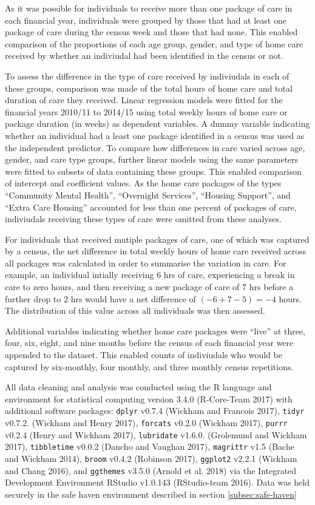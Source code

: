 \documentclass[]{article}
\begin{document}
As it was possible for individuals to receive more than one package of
care in each financial year, individuals were grouped by those that had
at least one package of care during the census week and those that had
none. This enabled comparison of the proportions of each age group,
gender, and type of home care received by whether an indiviudal had been
identified in the census or not.

To assess the difference in the type of care received by indiviudals in
each of these groups, comparison was made of the total hours of home
care and total duration of care they received. Linear regression models
were fitted for the financial years 2010/11 to 2014/15 using total
weekly hours of home care or package duration (in weeks) as dependent
variables. A dummy variable indicating whether an individual had a least
one package identified in a census was used as the independent
predictor. To compare how differences in care varied across age, gender,
and care type groups, further linear models using the same parameters
were fitted to subsets of data containing these groups. This enabled
comparison of intercept and coefficient values. As the home care
packages of the types ``Community Mental Health'', ``Overnight
Services'', ``Housing Support'', and ``Extra Care Housing'' accounted
for less than one percent of packages of care, indiviudals receiving
these types of care were omitted from these analyses.

For individuals that received mutiple packages of care, one of which was
captured by a census, the net difference in total weekly hours of home
care received across all packages was calculated in order to summarise
the variation in care. For example, an individual intially receiving 6
hrs of care, experiencing a break in care to zero hours, and then
receiving a new package of care of 7 hrs before a further drop to 2 hrs
would have a net difference of \((-6 + 7 - 5) = -4\) hours. The
distribution of this value across all individuals was then assessed.

Additional variables indicating whether home care packages were ``live''
at three, four, six, eight, and nine months before the census of each
financial year were appended to the dataset. This enabled counts of
indiviudals who would be captured by six-monthly, four monthly, and
three monthly census repetitions.

All data cleaning and analysis was conducted using the R language and
environment for statistical computing version 3.4.0 (R-Core-Team 2017)
with additional software packages: \texttt{dplyr} v0.7.4 (Wickham and
Francois 2017), \texttt{tidyr} v0.7.2. (Wickham and Henry 2017),
\texttt{forcats} v0.2.0 (Wickham 2017), \texttt{purrr} v0.2.4 (Henry and
Wickham 2017), \texttt{lubridate} v1.6.0. (Grolemund and Wickham 2017),
\texttt{tibbletime} v0.0.2 (Dancho and Vaughan 2017), \texttt{magrittr}
v1.5 (Bache and Wickham 2014), \texttt{broom} v0.4.2 (Robinson 2017),
\texttt{ggplot2} v2.2.1 (Wickham and Chang 2016), and \texttt{ggthemes}
v3.5.0 (Arnold et al. 2018) via the Integrated Development Environment
RStudio v1.0.143 (RStudio-team 2016). Data was held securely in the safe
haven environment described in section \ref{subsec:safe-haven}
\end{document}
